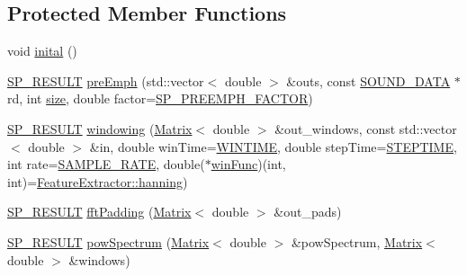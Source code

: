 \subsection*{Protected Member Functions}
\begin{DoxyCompactItemize}
\item 
void \hyperlink{class_feature_extractor_a9e3f6e6f907a3c38cf964e1543deeba8}{inital} ()
\item 
\hyperlink{tool_8h_ab71a1f2fb85a32402ced5c483105b38e}{S\+P\+\_\+\+R\+E\+S\+U\+L\+T} \hyperlink{class_feature_extractor_a5518198be2196786e1bec3e6023a37a7}{pre\+Emph} (std\+::vector$<$ double $>$ \&outs, const \hyperlink{configure__basic_8h_abf32ffaff24ba21700fbd0898b49ab02}{S\+O\+U\+N\+D\+\_\+\+D\+A\+T\+A} $\ast$rd, int \hyperlink{rastafilt_8m_a777f01fd1c8394e2fbac19f36c7d2f92}{size}, double factor=\hyperlink{configure__feature_8h_a2de01c3abba3964b9473896317c1a92b}{S\+P\+\_\+\+P\+R\+E\+E\+M\+P\+H\+\_\+\+F\+A\+C\+T\+O\+R})
\item 
\hyperlink{tool_8h_ab71a1f2fb85a32402ced5c483105b38e}{S\+P\+\_\+\+R\+E\+S\+U\+L\+T} \hyperlink{class_feature_extractor_a9a64eef33f089421f19dac46fae05fdf}{windowing} (\hyperlink{configure__basic_8h_a566a006016cf65b1b01bd2bc633e1c12}{Matrix}$<$ double $>$ \&out\+\_\+windows, const std\+::vector$<$ double $>$ \&in, double win\+Time=\hyperlink{configure__feature_8h_a3c7cd2baec6b66e368d67a3d911ec94c}{W\+I\+N\+T\+I\+M\+E}, double step\+Time=\hyperlink{configure__feature_8h_afaac62182127d845f3617df3cbae8917}{S\+T\+E\+P\+T\+I\+M\+E}, int rate=\hyperlink{configure__basic_8h_a7edeabaed4688e071a2c360f4d42dd89}{S\+A\+M\+P\+L\+E\+\_\+\+R\+A\+T\+E}, double($\ast$\hyperlink{class_feature_extractor_a573d66a2731f098e798ac6c0bc683ec2}{win\+Func})(int, int)=\hyperlink{class_feature_extractor_af32b291e5172d4c9d69086e581162423}{Feature\+Extractor\+::hanning})
\item 
\hyperlink{tool_8h_ab71a1f2fb85a32402ced5c483105b38e}{S\+P\+\_\+\+R\+E\+S\+U\+L\+T} \hyperlink{class_feature_extractor_a3d8f6602dc06a559cd369cf9c911b29d}{fft\+Padding} (\hyperlink{configure__basic_8h_a566a006016cf65b1b01bd2bc633e1c12}{Matrix}$<$ double $>$ \&out\+\_\+pads)
\item 
\hyperlink{tool_8h_ab71a1f2fb85a32402ced5c483105b38e}{S\+P\+\_\+\+R\+E\+S\+U\+L\+T} \hyperlink{class_feature_extractor_a949967b6fd081e7694257adc0990a07e}{pow\+Spectrum} (\hyperlink{configure__basic_8h_a566a006016cf65b1b01bd2bc633e1c12}{Matrix}$<$ double $>$ \&pow\+Spectrum, \hyperlink{configure__basic_8h_a566a006016cf65b1b01bd2bc633e1c12}{Matrix}$<$ double $>$ \&windows)

\end{DoxyCompactItemize}
